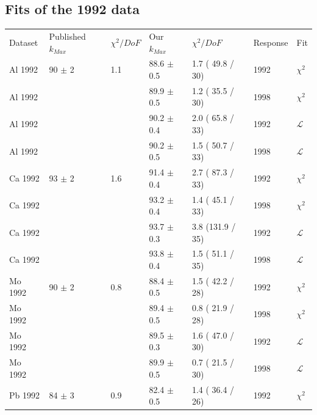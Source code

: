 \subsection { Fits of the 1992 data }
\begin{table}[h]
  \begin{center}
    \begin{tabular}{|l||l|l|l|l|l|l|}
      \hline
      Dataset & Published $k_{Max}$ & $\chi^2 / DoF$ & Our $k_{Max}$ & $\chi^2 / DoF$  & Response & Fit \\
      \hhline{|=||=|=|=|=|=|=|}
      Al 1992 & 90   $\pm$ 2   & 1.1 & 88.6 $\pm$ 0.5 & 1.7 ( 49.8 / 30) & 1992 & $\chi^2$      \\
      Al 1992 &                &     & 89.9 $\pm$ 0.5 & 1.2 ( 35.5 / 30) & 1998 & $\chi^2$      \\
      Al 1992 &                &     & 90.2 $\pm$ 0.4 & 2.0 ( 65.8 / 33) & 1992 & $\mathcal{L}$ \\
      Al 1992 &                &     & 90.2 $\pm$ 0.5 & 1.5 ( 50.7 / 33) & 1998 & $\mathcal{L}$ \\
      \hline                                                                                    
      Ca 1992 & 93   $\pm$ 2   & 1.6 & 91.4 $\pm$ 0.4 & 2.7 ( 87.3 / 33) & 1992 & $\chi^2$      \\
      Ca 1992 &                &     & 93.2 $\pm$ 0.4 & 1.4 ( 45.1 / 33) & 1998 & $\chi^2$      \\
      Ca 1992 &                &     & 93.7 $\pm$ 0.3 & 3.8 (131.9 / 35) & 1992 & $\mathcal{L}$ \\
      Ca 1992 &                &     & 93.8 $\pm$ 0.4 & 1.5 ( 51.1 / 35) & 1998 & $\mathcal{L}$ \\
      \hline                                                                                    
      Mo 1992 & 90   $\pm$ 2   & 0.8 & 88.4 $\pm$ 0.5 & 1.5 ( 42.2 / 28) & 1992 & $\chi^2$      \\
      Mo 1992 &                &     & 89.4 $\pm$ 0.5 & 0.8 ( 21.9 / 28) & 1998 & $\chi^2$      \\
      Mo 1992 &                &     & 89.5 $\pm$ 0.3 & 1.6 ( 47.0 / 30) & 1992 & $\mathcal{L}$ \\
      Mo 1992 &                &     & 89.9 $\pm$ 0.5 & 0.7 ( 21.5 / 30) & 1998 & $\mathcal{L}$ \\
      \hline                                                                                    
      Pb 1992 & 84   $\pm$ 3   & 0.9 & 82.4 $\pm$ 0.5 & 1.4 ( 36.4 / 26) & 1992 & $\chi^2$      \\

\end{tabular}
\end{center}
\end{table}
